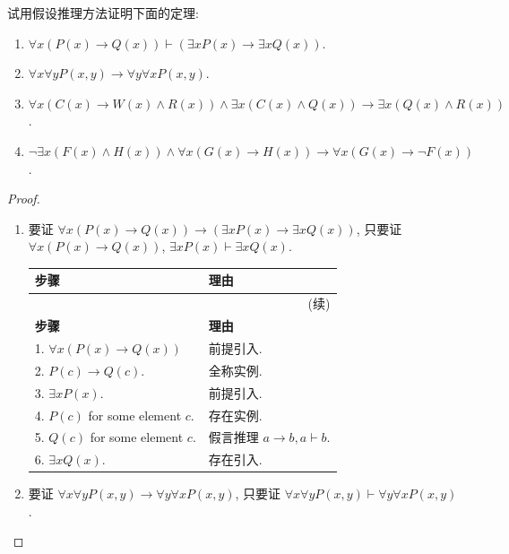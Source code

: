 \documentclass[10pt,UTF8]{book} %
\begin{document}
\begin{example}
    试用假设推理方法证明下面的定理:
    \begin{enumerate}[label={$\left.\arabic*\right)$}, itemsep=0pt]
        \item $\forall x \left(P(x) \to Q(x)\right) \vdash \left(
            \exists x P(x) \to \exists x Q(x)
        \right)$.
        \item $\forall x \forall y P(x,y) \to \forall y \forall x P(x,y)$.
        \item $\forall x \left( C(x) \to W(x) \wedge R(x) \right) \wedge
        \exists x \left(
            C(x) \wedge Q(x)
        \right) \to \exists x \left(
            Q(x) \wedge R(x)
        \right)$.
        \item $\lnot \exists x \left(
            F(x) \wedge H(x)
        \right) \wedge \forall x \left(
            G(x) \to H(x)
        \right) \to \forall x \left(
            G(x) \to \lnot F(x)
        \right)$.
    \end{enumerate}
    \begin{proof}
        \begin{enumerate}[label={$\left.\arabic*\right)$}, itemsep=0pt]
            \item 要证 $\forall x \left(P(x) \to Q(x)\right) \to \left(
                \exists x P(x) \to \exists x Q(x)
            \right)$, 只要证
            $\forall x \left(P(x) \to Q(x)\right)$, $\exists x P(x)
            \vdash \exists x Q(x)$.
            
            {\begin{longtable}{p{}p{}}
            \toprule
            \textbf{步骤} & \textbf{理由} \\
            \midrule
            \endfirsthead

            \multicolumn{2}{r}{(续)} \\
            \toprule
            \textbf{步骤} & \textbf{理由} \\
            \midrule
            \endhead

            \bottomrule
            \endfoot
            
            1. $\forall x \left(P(x) \to Q(x)\right)$ & 前提引入. \\ 
            2. $P(c) \to Q(c)$. & 全称实例. \\ 
            3. $\exists x P(x)$. & 前提引入. \\
            4. $P(c)$ for some element $c$. & 存在实例. \\ 
            5. $Q(c)$ for some element $c$. & 假言推理 $a \to b, a \vdash b$. \\ 
            6. $\exists x Q(x)$. & 存在引入. \\
            \end{longtable}}
            \item 要证 $\forall x \forall y P(x,y) \to \forall y \forall x P(x,y)$,
            只要证 $\forall x \forall y P(x,y) \vdash \forall y \forall x P(x,y)$.


\end{enumerate}
\end{proof}
\end{example}
\end{document}
